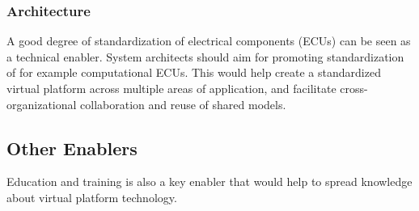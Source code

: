 \subsubsection{Architecture}
A good degree of standardization of electrical components (ECUs) can be seen as a technical enabler. System architects should aim for promoting standardization of for example computational ECUs.
This would help create a standardized virtual platform across multiple areas of application, and  facilitate cross-organizational collaboration and reuse of shared models.

\subsection{Other Enablers}
Education and training is also a key enabler that would help to spread knowledge about virtual platform technology.
